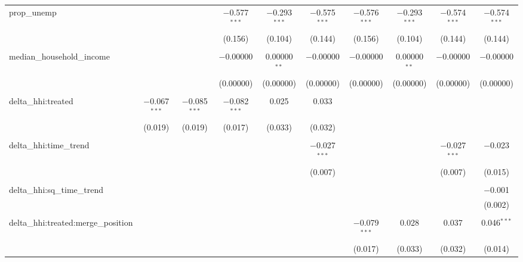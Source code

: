 \begin{table}[H]
{\begin{tabular}{@{\extracolsep{5pt}}lccccccccc}
  prop\_unemp &  &  & $-$0.577$^{***}$ & $-$0.293$^{***}$ & $-$0.575$^{***}$ & $-$0.576$^{***}$ & $-$0.293$^{***}$ & $-$0.574$^{***}$ & $-$0.574$^{***}$ \\  

   &  &  & (0.156) & (0.104) & (0.144) & (0.156) & (0.104) & (0.144) & (0.144) \\  

   & & & & & & & & & \\  

  median\_household\_income &  &  & $-$0.00000 & 0.00000$^{**}$ & $-$0.00000 & $-$0.00000 & 0.00000$^{**}$ & $-$0.00000 & $-$0.00000 \\  

   &  &  & (0.00000) & (0.00000) & (0.00000) & (0.00000) & (0.00000) & (0.00000) & (0.00000) \\  

   & & & & & & & & & \\  

  delta\_hhi:treated & $-$0.067$^{***}$ & $-$0.085$^{***}$ & $-$0.082$^{***}$ & 0.025 & 0.033 &  &  &  &  \\  

   & (0.019) & (0.019) & (0.017) & (0.033) & (0.032) &  &  &  &  \\  

   & & & & & & & & & \\  

  delta\_hhi:time\_trend &  &  &  &  & $-$0.027$^{***}$ &  &  & $-$0.027$^{***}$ & $-$0.023 \\  

   &  &  &  &  & (0.007) &  &  & (0.007) & (0.015) \\  

   & & & & & & & & & \\  

  delta\_hhi:sq\_time\_trend &  &  &  &  &  &  &  &  & $-$0.001 \\  

   &  &  &  &  &  &  &  &  & (0.002) \\  

   & & & & & & & & & \\  

  delta\_hhi:treated:merge\_position &  &  &  &  &  & $-$0.079$^{***}$ & 0.028 & 0.037 & 0.046$^{***}$ \\  

   &  &  &  &  &  & (0.017) & (0.033) & (0.032) & (0.014) \\  


\end{tabular}}
\end{table}
